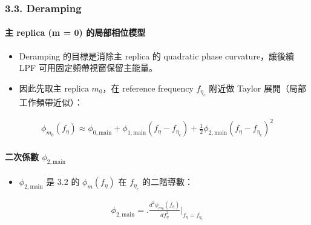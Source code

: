 \documentclass[11pt]{article}
\providecommand{\tightlist}{%
  \setlength{\itemsep}{0pt}\setlength{\parskip}{0pt}}
\begin{document}
\hypertarget{deramping}{%
\subsubsection{3.3. Deramping}\label{deramping}}

\hypertarget{ux4e3b-replica-m-0-ux7684ux5c40ux90e8ux76f8ux4f4dux6a21ux578b}{%
\paragraph{主 replica (m = 0)
的局部相位模型}\label{ux4e3b-replica-m-0-ux7684ux5c40ux90e8ux76f8ux4f4dux6a21ux578b}}

\begin{itemize}
\tightlist
\item
  Deramping 的目標是消除主 replica 的 quadratic phase curvature，讓後續
  LPF 可用固定頻帶視窗保留主能量。
\item
  因此先取主 replica \(m_0\)，在 reference frequency \(f_{\eta_c}\)
  附近做 Taylor 展開（局部工作頻帶近似）：
\end{itemize}

\begin{equation}
\begin{aligned}
\phi_{m_0}(f_\eta)\approx
\phi_{0,\mathrm{main}}+\phi_{1,\mathrm{main}}(f_\eta-f_{\eta_c})+\frac{1}{2}\phi_{2,\mathrm{main}}(f_\eta-f_{\eta_c})^2
\end{aligned}
\end{equation}

\hypertarget{ux4e8cux6b21ux4fc2ux6578-phi_2mathrmmain}{%
\paragraph{\texorpdfstring{二次係數
\(\phi_{2,\mathrm{main}}\)}{二次係數 \textbackslash phi\_\{2,\textbackslash mathrm\{main\}\}}}\label{ux4e8cux6b21ux4fc2ux6578-phi_2mathrmmain}}

\begin{itemize}
\tightlist
\item
  \(\phi_{2,\mathrm{main}}\) 是 3.2 的 \(\phi_m(f_\eta)\) 在
  \(f_{\eta_c}\) 的二階導數：
\end{itemize}

\begin{equation}
\begin{aligned}
\phi_{2,\mathrm{main}} = \biggl.\frac{d^2\phi_{m_0}(f_\eta)}{df_\eta^2}\biggr|_{f_\eta=f_{\eta_c}}
\end{aligned}
\end{equation}
\end{document}
